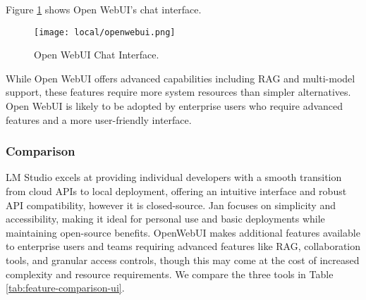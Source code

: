 Figure \ref{fig:openwebui} shows Open WebUI's chat interface.

\begin{figure}[H]
\centering
\texttt{[image: local/openwebui.png]}
\caption{Open WebUI Chat Interface.}
\label{fig:openwebui}
\end{figure}

While Open WebUI offers advanced capabilities including RAG and multi-model support, these features require more system resources than simpler alternatives. Open WebUI is likely to be adopted by enterprise users who require advanced features and a more user-friendly interface.

\subsubsection{Comparison}

LM Studio excels at providing individual developers with a smooth transition from cloud APIs to local deployment, offering an intuitive interface and robust API compatibility, however it is closed-source. Jan focuses on simplicity and accessibility, making it ideal for personal use and basic deployments while maintaining open-source benefits. OpenWebUI makes additional features available to enterprise users and teams requiring advanced features like RAG, collaboration tools, and granular access controls, though this may come at the cost of increased complexity and resource requirements. We compare the three tools in Table \ref{tab:feature-comparison-ui}.

